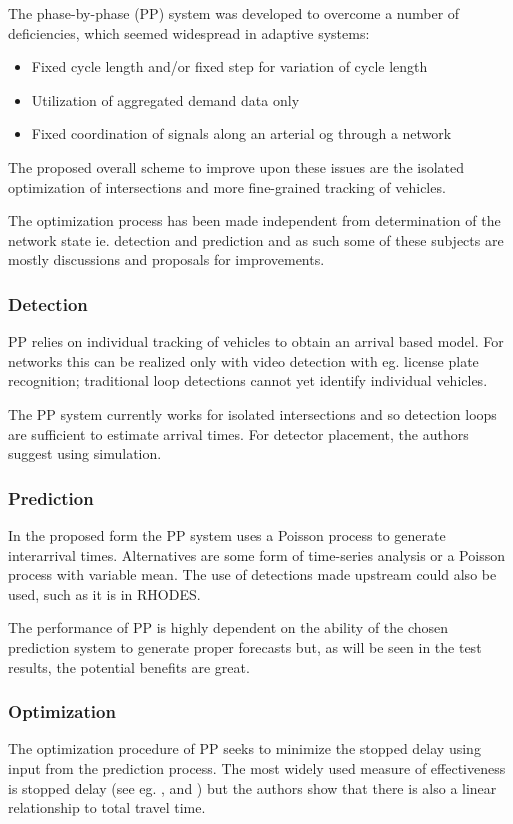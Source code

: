 The phase-by-phase (PP) system was developed to overcome a number of deficiencies, which seemed widespread in adaptive systems:

\begin{itemize}
\item Fixed cycle length and/or fixed step for variation of cycle length
\item Utilization of aggregated demand data only
\item Fixed coordination of signals along an arterial og through a network
\end{itemize}

The proposed overall scheme to improve upon these issues are the isolated optimization of intersections and more fine-grained tracking of vehicles.

The optimization process has been made independent from determination of the network state ie. detection and prediction and as such some of these subjects are mostly discussions and proposals for improvements.

\subsubsection*{Detection}
PP relies on individual tracking of vehicles to obtain an arrival based model. For networks this can be realized only with video detection with eg. license plate recognition; traditional loop detections cannot yet identify individual vehicles.

The PP system currently works for isolated intersections and so detection loops are sufficient to estimate arrival times. For detector placement, the authors suggest using simulation.

\subsubsection*{Prediction}
In the proposed form the PP system uses a Poisson process to generate interarrival times.
Alternatives are some form of time-series analysis or a Poisson process with variable mean. The use of detections made upstream could also be used, such as it is in RHODES.

The performance of PP is highly dependent on the ability of the chosen prediction system to generate proper forecasts but, as will be seen in the test results, the potential benefits are great.

\subsubsection*{Optimization}
The optimization procedure of PP seeks to minimize the stopped delay using input from the prediction process. The most widely used measure of effectiveness is stopped delay (see eg. \cite{9}, \cite{38} and \cite{31}) but the authors show that there is also a linear relationship to total travel time.

